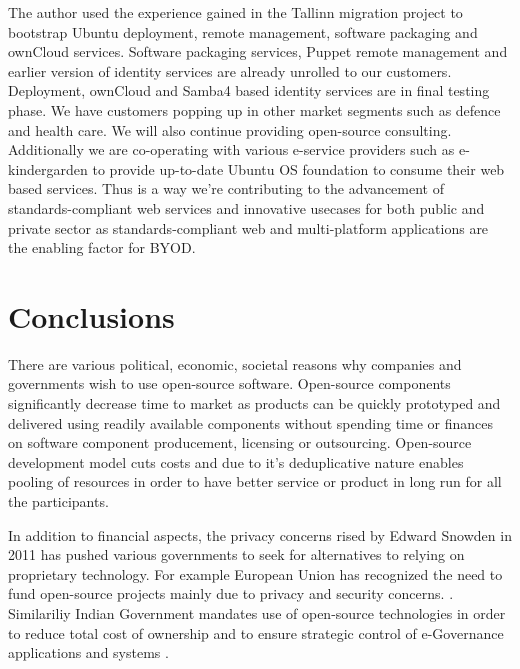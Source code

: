 \documentclass{article}
\begin{document}

The author used the experience gained in the Tallinn migration project
to bootstrap Ubuntu deployment, remote management,
software packaging and ownCloud services.
Software packaging services, Puppet remote management
and earlier version of identity services
are already unrolled to our customers.
Deployment, ownCloud and Samba4 based identity services are in final testing phase.
We have customers popping up in other market segments such as defence and health care.
We will also continue providing open-source consulting.
Additionally we are co-operating with various e-service providers
such as e-kindergarden to provide up-to-date
Ubuntu OS foundation to consume their web based services.
Thus is a way we're contributing to the advancement of
standards-compliant web services and innovative usecases
for both public and private sector as standards-compliant
web and multi-platform applications are the enabling factor for
BYOD.


\section{Conclusions}

There are various political, economic, societal reasons why
companies and governments wish to use open-source software.
Open-source components significantly decrease time to market
as products can be quickly prototyped and delivered using
readily available components without spending time or finances on
software component producement, licensing or outsourcing.
Open-source development model cuts costs and due to
it's deduplicative nature enables pooling of resources
in order to have better service or product in long run
for all the participants.

In addition to financial aspects, the privacy concerns rised by
Edward Snowden in 2011
\cite{edward-snowden-revelations}
has pushed various governments to seek for alternatives
to relying on proprietary technology.
For example
European Union has recognized the need to fund open-source projects
mainly due to privacy and security concerns.
\cite{eu-should-finance-open-source}.
Similariliy Indian Government mandates use of open-source technologies
in order to reduce total cost of ownership and to ensure
strategic control of e-Governance applications and systems
\cite{open-source-adoption-at-government-of-india}.
\end{document}
